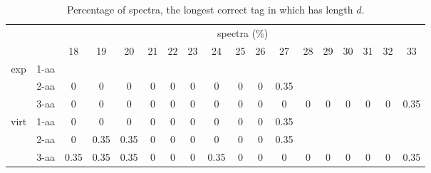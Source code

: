 \documentclass{article}
\begin{document}
\begin{table}[h]\tiny
\vspace{3mm}
{\centering
\begin{center}
\begin{tabular}{|c|l|c|c|c|c|c|c|c|c|c|c|c|c|c|c|c|c|}
  \hline
  \multicolumn{2}{|c|}{ } & \multicolumn{ 16 }{|c|}{ spectra (\%)} \\
  \cline{3- 18}
  \multicolumn{2}{|c|}{ }  & 18 & 19 & 20 & 21 & 22 & 23 & 24 & 25 & 26 & 27 & 28 & 29 & 30 & 31 & 32 & 33\\
  \hline
  \multirow{3}{*}{exp}
&  1-aa  &  &  &  &  &  &  &  &  &  &  &  &  &  &  &  & \\&  2-aa  & 0 & 0 & 0 & 0 & 0 & 0 & 0 & 0 & 0 & 0.35 &  &  &  &  &  & \\&  3-aa  & 0 & 0 & 0 & 0 & 0 & 0 & 0 & 0 & 0 & 0 & 0 & 0 & 0 & 0 & 0 & 0.35\\ \hline
  \multirow{3}{*}{virt} 
&  1-aa  & 0 & 0 & 0 & 0 & 0 & 0 & 0 & 0 & 0 & 0.35 &  &  &  &  &  & \\&  2-aa  & 0 & 0.35 & 0.35 & 0 & 0 & 0 & 0 & 0 & 0 & 0.35 &  &  &  &  &  & \\&  3-aa  & 0.35 & 0.35 & 0.35 & 0 & 0 & 0 & 0.35 & 0 & 0 & 0 & 0 & 0 & 0 & 0 & 0 & 0.35\\ \hline
\end{tabular}
\end{center}
\par}
\centering
\caption{ Percentage of spectra, the longest correct tag in which has length $d$.}
\vspace{3mm}
\label{table:longest-correct-d-tag}
\end{table}
\end{document}
